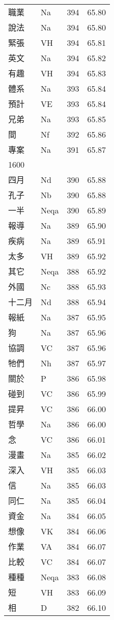 \documentclass[twocolumn]{book}
\begin{document}
\begin{supertabular}{llrr}
職業 & Na & 394 &  65.80\\
說法 & Na & 394 &  65.80\\
緊張 & VH & 394 &  65.81\\
英文 & Na & 394 &  65.82\\
有趣 & VH & 394 &  65.83\\
體系 & Na & 393 &  65.84\\
預計 & VE & 393 &  65.84\\
兄弟 & Na & 393 &  65.85\\
間 & Nf & 392 &  65.86\\
專案 & Na & 391 &  65.87\\
1600\\
四月 & Nd & 390 &  65.88\\
孔子 & Nb & 390 &  65.88\\
一半 & Neqa & 390 &  65.89\\
報導 & Na & 389 &  65.90\\
疾病 & Na & 389 &  65.91\\
太多 & VH & 389 &  65.92\\
其它 & Neqa & 388 &  65.92\\
外國 & Nc & 388 &  65.93\\
十二月 & Nd & 388 &  65.94\\
報紙 & Na & 387 &  65.95\\
狗 & Na & 387 &  65.96\\
協調 & VC & 387 &  65.96\\
牠們 & Nh & 387 &  65.97\\
關於 & P & 386 &  65.98\\
碰到 & VC & 386 &  65.99\\
提昇 & VC & 386 &  66.00\\
哲學 & Na & 386 &  66.00\\
念 & VC & 386 &  66.01\\
漫畫 & Na & 385 &  66.02\\
深入 & VH & 385 &  66.03\\
信 & Na & 385 &  66.03\\
同仁 & Na & 385 &  66.04\\
資金 & Na & 384 &  66.05\\
想像 & VK & 384 &  66.06\\
作業 & VA & 384 &  66.07\\
比較 & VC & 384 &  66.07\\
種種 & Neqa & 383 &  66.08\\
短 & VH & 383 &  66.09\\
相 & D & 382 &  66.10\\

\end{supertabular}
\end{document}
